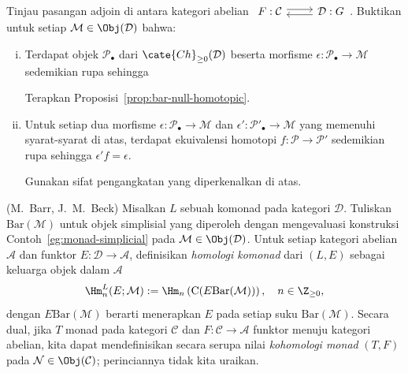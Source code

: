 	\item Tinjau pasangan adjoin di antara kategori abelian
	$\begin{tikzcd}
		F: \mathcal{C} \arrow[shift left, r] & \mathcal{D}: G \arrow[shift left, l]
	\end{tikzcd}$.
	Buktikan untuk setiap $\mathcal{M}\in\Obj(\mathcal{D})$ bahwa:
	\begin{enumerate}[(i)]
		\item Terdapat objek $\mathcal{P}_\bullet$ dari
		$\cate{Ch}_{\geq0}(\mathcal{D})$ beserta morfisme
		$\epsilon:\mathcal{P}_\bullet\to\mathcal{M}$ sedemikian rupa sehingga
		\begin{hint}
			Terapkan Proposisi~\ref{prop:bar-null-homotopic}.
		\end{hint}
		\item Untuk setiap dua morfisme
		$\epsilon:\mathcal{P}_\bullet\to\mathcal{M}$ dan
		$\epsilon':\mathcal{P}'_\bullet\to\mathcal{M}$ yang memenuhi
		syarat-syarat di atas, terdapat ekuivalensi homotopi
		$f:\mathcal{P}\to\mathcal{P}'$ sedemikian rupa sehingga
		$\epsilon'f=\epsilon$.
		\begin{hint}
			Gunakan sifat pengangkatan yang diperkenalkan di atas.
		\end{hint}
	\end{enumerate}

	\item (M.\ Barr, J.\ M.\ Beck) Misalkan $L$ sebuah komonad pada
	kategori $\mathcal{D}$. Tuliskan $\mathrm{Bar}(\mathcal{M})$ untuk
	objek simplisial yang diperoleh dengan mengevaluasi konstruksi
	Contoh~\ref{eg:monad-simplicial} pada
	$\mathcal{M}\in\Obj(\mathcal{D})$. Untuk setiap kategori abelian
	$\mathcal{A}$ dan funktor $E:\mathcal{D}\to\mathcal{A}$, definisikan
	\emph{homologi komonad} dari $(L,E)$ sebagai keluarga objek dalam
	$\mathcal{A}$
	\[ \Hm^L_n(E; \mathcal{M}) := \Hm_n\left( \mathrm{C}(E\mathrm{Bar}(\mathcal{M})) \right), \quad n \in \Z_{\geq 0}, \]
	dengan $E\mathrm{Bar}(\mathcal{M})$ berarti menerapkan $E$ pada setiap
	suku $\mathrm{Bar}(\mathcal{M})$. Secara dual, jika $T$ monad pada
	kategori $\mathcal{C}$ dan $F:\mathcal{C}\to\mathcal{A}$ funktor menuju
	kategori abelian, kita dapat mendefinisikan secara serupa nilai
	\emph{kohomologi monad} $(T,F)$ pada
	$\mathcal{N}\in\Obj(\mathcal{C})$; perinciannya tidak kita uraikan.

